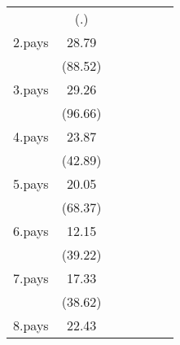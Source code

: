 {\begin{tabular}{l*{6}{c}}
                    &         (.)         &                     &                     &                     &                     &                     \\
[1em]
2.pays              &       28.79\sym{***}&                     &                     &                     &                     &                     \\
                    &     (88.52)         &                     &                     &                     &                     &                     \\
[1em]
3.pays              &       29.26\sym{***}&                     &                     &                     &                     &                     \\
                    &     (96.66)         &                     &                     &                     &                     &                     \\
[1em]
4.pays              &       23.87\sym{***}&                     &                     &                     &                     &                     \\
                    &     (42.89)         &                     &                     &                     &                     &                     \\
[1em]
5.pays              &       20.05\sym{***}&                     &                     &                     &                     &                     \\
                    &     (68.37)         &                     &                     &                     &                     &                     \\
[1em]
6.pays              &       12.15\sym{***}&                     &                     &                     &                     &                     \\
                    &     (39.22)         &                     &                     &                     &                     &                     \\
[1em]
7.pays              &       17.33\sym{***}&                     &                     &                     &                     &                     \\
                    &     (38.62)         &                     &                     &                     &                     &                     \\
[1em]
8.pays              &       22.43\sym{***}&                     &                     &                     &                     &                     \\

\end{tabular}}
